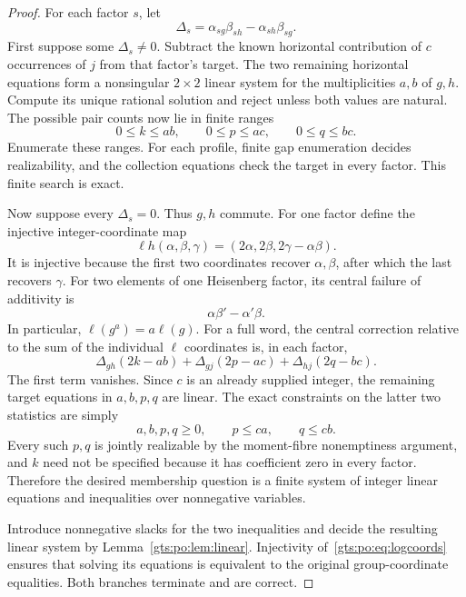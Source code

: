 \documentclass[11pt,letterpaper]{article}
\theoremstyle{definition}
\theoremstyle{remark}
\newcommand{\ellg}{\ell}
\begin{document}
\begin{proof}
For each factor $s$, let
\[
 \Delta_s=\alpha_{sg}\beta_{sh}-\alpha_{sh}\beta_{sg}.
\]
First suppose some $\Delta_s\ne0$. Subtract the known horizontal contribution of $c$ occurrences of $j$ from that factor's target. The two remaining horizontal equations form a nonsingular $2\times2$ linear system for the multiplicities $a,b$ of $g,h$. Compute its unique rational solution and reject unless both values are natural. The possible pair counts now lie in finite ranges
\[
 0\le k\le ab,\qquad 0\le p\le ac,\qquad 0\le q\le bc.
\]
Enumerate these ranges. For each profile, finite gap enumeration decides realizability, and the collection equations check the target in every factor. This finite search is exact.

Now suppose every $\Delta_s=0$. Thus $g,h$ commute. For one factor define the injective integer-coordinate map
\begin{equation}\label{gts:po:eq:logcoords}
 \ellg h(\alpha,\beta,\gamma)=(2\alpha,2\beta,2\gamma-\alpha\beta).
\end{equation}
It is injective because the first two coordinates recover $\alpha,\beta$, after which the last recovers $\gamma$. For two elements of one Heisenberg factor, its central failure of additivity is
\[
 \alpha\beta'-\alpha'\beta.
\]
In particular, $\ellg(g^a)=a\ellg(g)$. For a full word, the central correction relative to the sum of the individual $\ellg$ coordinates is, in each factor,
\begin{equation}\label{gts:po:eq:logcorrection}
 \Delta_{gh}(2k-ab)+\Delta_{gj}(2p-ac)+\Delta_{hj}(2q-bc).
\end{equation}
The first term vanishes. Since $c$ is an already supplied integer, the remaining target equations in $a,b,p,q$ are linear. The exact constraints on the latter two statistics are simply
\[
 a,b,p,q\ge0,\qquad p\le ca,\qquad q\le cb.
\]
Every such $p,q$ is jointly realizable by the moment-fibre nonemptiness argument, and $k$ need not be specified because it has coefficient zero in every factor. Therefore the desired membership question is a finite system of integer linear equations and inequalities over nonnegative variables.

Introduce nonnegative slacks for the two inequalities and decide the resulting linear system by Lemma~\ref{gts:po:lem:linear}. Injectivity of~\eqref{gts:po:eq:logcoords} ensures that solving its equations is equivalent to the original group-coordinate equalities. Both branches terminate and are correct.
\end{proof}
\end{document}
